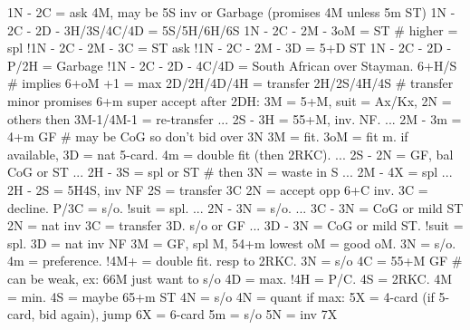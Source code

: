 1N -
2C = ask 4M, may be 5S inv or Garbage (promises 4M unless 5m ST)
    1N - 2C - 2D - 3H/3S/4C/4D = 5S/5H/6H/6S
    1N - 2C - 2M - 3oM = ST  # higher = spl
    !1N - 2C - 2M - 3C = ST ask
    !1N - 2C - 2M - 3D = 5+D ST
    1N - 2C - 2D - P/2H = Garbage
    !1N - 2C - 2D - 4C/4D = South African over Stayman. 6+H/S  # implies 6+oM
        +1 = max
2D/2H/4D/4H = transfer 2H/2S/4H/4S  # transfer minor promises 6+m
    super accept after 2DH: 3M = 5+M, suit = Ax/Kx, 2N = others
        then 3M-1/4M-1 = re-transfer
    ... 2S - 3H = 55+M, inv. NF.
    ... 2M - 3m = 4+m GF  # may be CoG so don't bid over 3N
        3M = fit. 3oM = fit m. if available, 3D = nat 5-card. 4m = double fit (then 2RKC).
    ... 2S - 2N = GF, bal CoG or ST
    ... 2H - 3S = spl or ST  # then 3N = waste in S
    ... 2M - 4X = spl
    ... 2H - 2S = 5H4S, inv NF
2S = transfer 3C
    2N = accept opp 6+C inv. 3C = decline.
        P/3C = s/o. 
        !suit = spl.
        ... 2N - 3N = s/o. ... 3C - 3N = CoG or mild ST
2N = nat inv
3C = transfer 3D. s/o or GF
    ... 3D - 3N = CoG or mild ST. 
    !suit = spl.
3D = nat inv NF
3M = GF, spl M, 54+m
    lowest oM = good oM. 3N = s/o. 4m = preference.
    !4M+ = double fit. resp to 2RKC.
3N = s/o
4C = 55+M GF  # can be weak, ex: 66M just want to s/o
    4D = max.
        !4H = P/C. 4S = 2RKC.
    4M = min.
4S = maybe 65+m ST
    4N = s/o
4N = quant
    if max: 5X = 4-card (if 5-card, bid again), jump 6X = 6-card
5m = s/o
5N = inv 7X